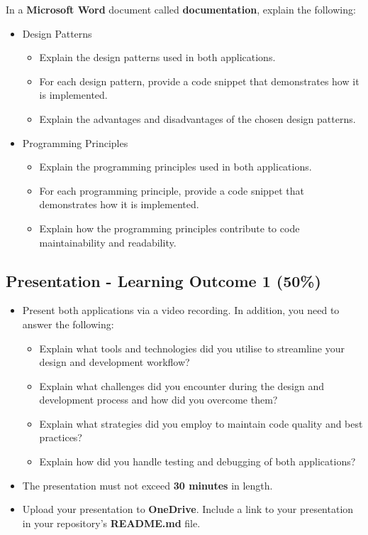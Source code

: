 \documentclass{article}
\begin{document}
In a \textbf{Microsoft Word} document called \textbf{documentation}, explain the following:
\begin{itemize}
	\item Design Patterns
	\begin{itemize}
		\item Explain the design patterns used in both applications. 
		\item For each design pattern, provide a code snippet that demonstrates how it is implemented.
		\item Explain the advantages and disadvantages of the chosen design patterns. 
	\end{itemize}
	\item Programming Principles
	\begin{itemize}
		\item Explain the programming principles used in both applications.
		\item For each programming principle, provide a code snippet that demonstrates how it is implemented.
		\item Explain how the programming principles contribute to code maintainability and readability.
	\end{itemize}
\end{itemize}

\subsection*{Presentation - Learning Outcome 1 (50\%)}
\begin{itemize}
	\item Present both applications via a video recording. In addition, you need to answer the following:
	\begin{itemize}
		\item Explain what tools and technologies did you utilise to streamline your design and development workflow?
		\item Explain what challenges did you encounter during the design and development process and how did you overcome them?
		\item Explain what strategies did you employ to maintain code quality and best practices?
		\item Explain how did you handle testing and debugging of both applications?
	\end{itemize}
	\item The presentation must not exceed \textbf{30 minutes} in length.
	\item Upload your presentation to \textbf{OneDrive}. Include a link to your presentation in your repository's \textbf{README.md} file.
\end{itemize}
\end{document}
